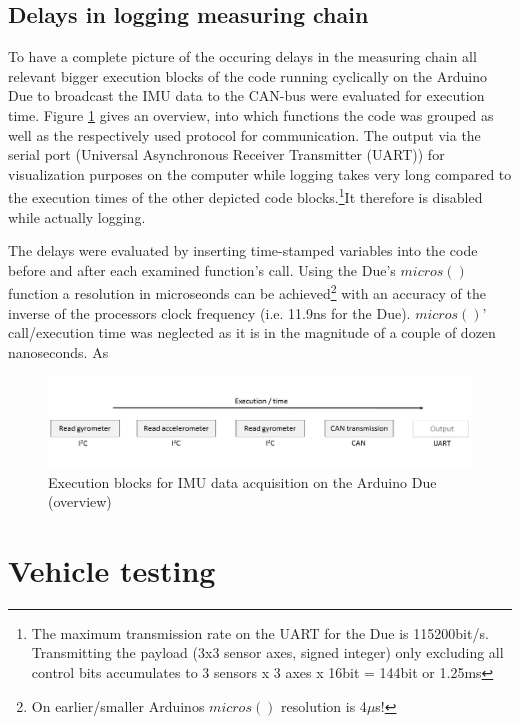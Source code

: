 \documentclass[ExampleMasters.tex]{subfiles}
\begin{document}
\subsection{Delays in logging measuring chain}
\label{sec:delays_on_arduino}

To have a complete picture of the occuring delays in the measuring chain all relevant bigger execution blocks of the code running cyclically on the Arduino Due to broadcast the IMU data to the CAN-bus were evaluated for execution time. Figure \ref{fig:arduino_delays_sketch} gives an overview, into which functions the code was grouped as well as the respectively used protocol for communication. The output via the serial port (Universal Asynchronous Receiver Transmitter (UART)) for visualization purposes on the computer while logging takes very long compared to the execution times of the other depicted code blocks.\footnote{The maximum transmission rate on the UART for the Due is 115200bit/s. Transmitting the payload (3x3 sensor axes, signed integer) only excluding all control bits accumulates to 3 sensors x 3 axes x 16bit = 144bit  or 1.25ms}It therefore is disabled while actually logging. 

The delays were evaluated by inserting time-stamped variables into the code before and after each examined function's call. Using the Due's $micros()$ function a resolution in microseonds can be achieved\footnote{On earlier/smaller Arduinos $micros()$ resolution is 4$\mu$s!} with an accuracy of the inverse of the processors clock frequency (i.e. 11.9ns for the Due). $micros()$' call/execution time was neglected as it is in the magnitude of a couple of dozen nanoseconds. As 

\begin{figure}[h!]
\centering
\includegraphics[width=1\linewidth]{figures/arduino_delays_sketch}
\caption{Execution blocks for IMU data acquisition on the Arduino Due (overview)}
\label{fig:arduino_delays_sketch}
\end{figure}


\section{Vehicle testing}
\label{sec:vehicle-testing}
\end{document}
